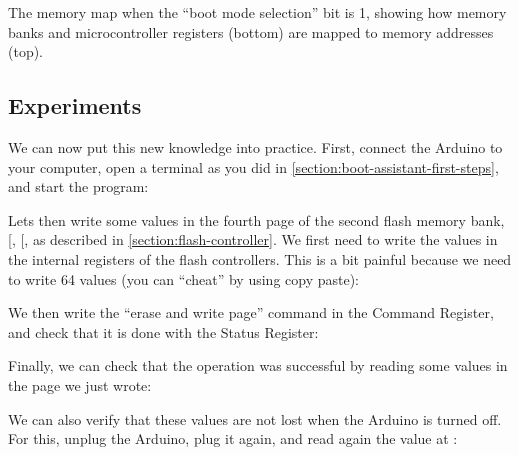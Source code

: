 \begin{Figure}
  
  \caption{The memory map when the ``boot mode selection'' bit is 1, showing
  how memory banks and microcontroller registers (bottom) are mapped to memory
  addresses (top).}\label{fig:memory-map}
\end{Figure}

\subsection{Experiments}

We can now put this new knowledge into practice. First, connect the Arduino to
your computer, open a terminal as you did in
\cref{section:boot-assistant-first-steps}, and start the 
program:


\noindent Lets then write some values in the fourth page of the second flash
memory bank, [, [, as described in
\cref{section:flash-controller}. We first need to write the values in the
internal registers of the flash controllers. This is a bit painful because we
need to write 64 values (you can ``cheat'' by using copy paste):


\noindent We then write the ``erase and write page'' command in the Command
Register, and check that it is done with the Status Register:


\noindent Finally, we can check that the operation was successful by reading
some values in the page we just wrote:


\noindent We can also verify that these values are not lost when the Arduino is
turned off. For this, unplug the Arduino, plug it again, and read again the
value at :


